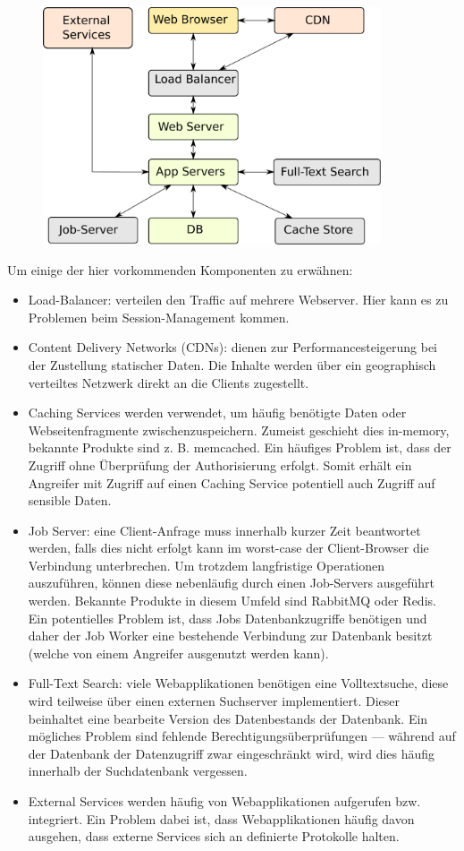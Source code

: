 \begin{figure}[h!]
\includegraphics[width=10cm]{images/web_components.pdf}
\centering
\end{figure}

Um einige der hier vorkommenden Komponenten zu erwähnen:

\begin{itemize}
	\item Load-Balancer: verteilen den Traffic auf mehrere Webserver. Hier kann es zu Problemen beim Session-Management kommen.
	\item Content Delivery Networks (CDNs): dienen zur Performancesteigerung bei der Zustellung statischer Daten. Die Inhalte werden über ein geographisch verteiltes Netzwerk direkt an die Clients zugestellt.
	\item Caching Services werden verwendet, um häufig benötigte Daten oder Webseitenfragmente zwischenzuspeichern. Zumeist geschieht dies in-memory, bekannte Produkte sind z. B. memcached. Ein häufiges Problem ist, dass der Zugriff ohne Überprüfung der Authorisierung erfolgt. Somit erhält ein Angreifer mit Zugriff auf einen Caching Service potentiell auch Zugriff auf sensible Daten.
	\item Job Server: eine Client-Anfrage muss innerhalb kurzer Zeit beantwortet werden, falls dies nicht erfolgt kann im worst-case der Client-Browser die Verbindung unterbrechen. Um trotzdem langfristige Operationen auszuführen, können diese nebenläufig durch einen Job-Servers ausgeführt werden. Bekannte Produkte in diesem Umfeld sind RabbitMQ oder Redis. Ein potentielles Problem ist, dass Jobs Datenbankzugriffe benötigen und daher der Job Worker eine bestehende Verbindung zur Datenbank besitzt (welche von einem Angreifer ausgenutzt werden kann).
	\item Full-Text Search: viele Webapplikationen benötigen eine Volltextsuche, diese wird teilweise über einen externen Suchserver implementiert. Dieser beinhaltet eine bearbeite Version des Datenbestands der Datenbank. Ein mögliches Problem sind fehlende Berechtigungsüberprüfungen --- während auf der Datenbank der Datenzugriff zwar eingeschränkt wird, wird dies häufig innerhalb der Suchdatenbank vergessen.
	\item External Services werden häufig von Webapplikationen aufgerufen bzw. integriert. Ein Problem dabei ist, dass Webapplikationen häufig davon ausgehen, dass externe Services sich an definierte Protokolle halten.
\end{itemize}

